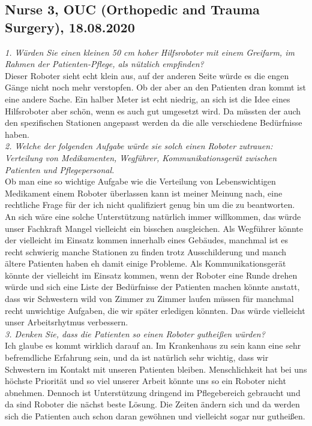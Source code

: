 \documentclass[plainarticle,zihtitle,english,final,hyperref,utf8]{zihpub}
\begin{document}
\begin{appendices}
\subsection{Nurse 3, OUC (Orthopedic and Trauma Surgery), 18.08.2020}
\textit{1. Würden Sie einen kleinen 50 cm hoher Hilfsroboter mit einem Greifarm, im Rahmen der Patienten-Pflege, als nützlich empfinden?}\\
\newline
Dieser Roboter sieht echt klein aus, auf der anderen Seite würde es die engen Gänge nicht noch mehr verstopfen. Ob der aber an den Patienten dran kommt ist eine andere Sache. Ein halber Meter ist echt niedrig, an sich ist die Idee eines Hilfsroboter aber schön, wenn es auch gut umgesetzt wird. Da müssten der auch den spezifischen Stationen angepasst werden da die alle verschiedene Bedürfnisse haben.\\
\newline
\textit{2. Welche der folgenden Aufgabe würde sie solch einen Roboter zutrauen: Verteilung von Medikamenten, Wegführer, Kommunikationsgerät zwischen Patienten und Pflegepersonal.}\\
\newline
Ob man eine so wichtige Aufgabe wie die Verteilung von Lebenswichtigen Medikament einem Roboter überlassen kann ist meiner Meinung nach, eine rechtliche Frage für der ich nicht qualifiziert genug bin um die zu beantworten. An sich wäre eine solche Unterstützung natürlich immer willkommen, das würde unser Fachkraft Mangel vielleicht ein bisschen ausgleichen. Als Wegführer könnte der vielleicht im Einsatz kommen innerhalb eines Gebäudes, manchmal ist es recht schwierig manche Stationen zu finden trotz Ausschilderung und manch ältere Patienten haben eh damit einige Probleme. Als Kommunikationsgerät könnte der vielleicht im Einsatz kommen, wenn der Roboter eine Runde drehen würde und sich eine Liste der Bedürfnisse der Patienten machen könnte anstatt, dass wir Schwestern wild von Zimmer zu Zimmer laufen müssen für manchmal recht unwichtige Aufgaben, die wir später erledigen könnten. Das würde vielleicht unser Arbeitsrhytmus verbessern.\\
\newline
\textit{3. Denken Sie, dass die Patienten so einen Roboter gutheißen würden?}\\
\newline
Ich glaube es kommt wirklich darauf an. Im Krankenhaus zu sein kann eine sehr befremdliche Erfahrung sein, und da ist natürlich sehr wichtig, dass wir Schwestern im Kontakt mit unseren Patienten bleiben. Menschlichkeit hat bei uns höchste Priorität und so viel unserer Arbeit könnte uns so ein Roboter nicht abnehmen. Dennoch ist Unterstützung dringend im Pflegebereich gebraucht und da sind Roboter die nächst beste Lösung. Die Zeiten ändern sich und da werden sich die Patienten auch schon daran gewöhnen und vielleicht sogar nur gutheißen. 

\end{appendices}
\end{document}

